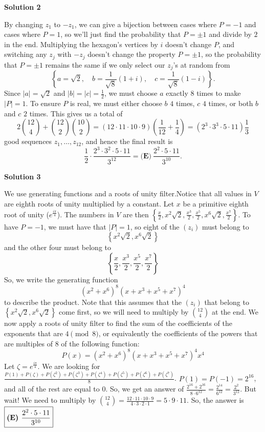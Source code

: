 \begin{enumerate}
\textbf{Solution 2}

By changing $z_1$ to $-z_1$, we can give a bijection between cases where $P=-1$ and cases where $P=1$, so we'll just find the probability that $P=\pm 1$ and divide by $2$ in the end. Multiplying the hexagon's vertices by $i$ doesn't change $P$, and switching any $z_j$ with $-z_j$ doesn't change the property $P=\pm 1$, so the probability that $P=\pm1$ remains the same if we only select our $z_j$'s at random from
 \[\left\{a= \sqrt 2,\quad b=\frac1{\sqrt{8}}(1+i),\quad c=\frac1{\sqrt{8}}(1-i)\right\}.\]Since $|a|=\sqrt2$ and $|b|=|c|=\frac12$, we must choose $a$ exactly $8$ times to make $|P|=1$. To ensure $P$ is real, we must either choose $b$ $4$ times, $c$ $4$ times, or both $b$ and $c$ $2$ times. This gives us a total of 
 \[2\binom{12}{4}+\binom{12}{2}\binom{10}{2}=(12\cdot 11\cdot 10\cdot 9)\left(\frac1{12}+\frac14\right)=(2^3\cdot 3^3\cdot 5\cdot 11)\frac13\]good sequences $z_1,\dots,z_{12}$, and hence the final result is
 \[\frac12\cdot \frac{2^3\cdot 3^2\cdot 5\cdot 11}{3^{12}}=\boxed{\textbf{(E)} ~\frac{2^2\cdot 5\cdot 11}{3^{10}}}.\]




\textbf{Solution 3}

We use generating functions and a roots of unity filter.Notice that all values in $V$ are eighth roots of unity multiplied by a constant.  Let $x$ be a primitive eighth root of unity ($e^{\frac{i\pi}{4}}$).  The numbers in $V$ are then $\left \{ \frac{x}{2},x^2\sqrt2,\frac{x^3}{2},\frac{x^5}{2},x^6\sqrt2,\frac{x^7}{2} \right\}$.  To have $P=-1$, we must have that $|P|=1$, so eight of the $(z_i)$ must belong to 
 \[\left \{ x^2\sqrt2,x^6\sqrt2 \right\}\]and the other four must belong to 
 \[\left \{ \frac{x}{2},\frac{x^3}{2},\frac{x^5}{2},\frac{x^7}{2} \right\}\]So, we write the generating function 
 \[\left (x^2 +x^6 \right )^8 \left (x+x^3+x^5+x^7 \right )^4\]to describe the product.  Note that this assumes that the $(z_i)$ that belong to $\left \{ x^2\sqrt2,x^6\sqrt2 \right\}$ come first, so we will need to multiply by $\binom{12}{4}$ at the end.  We now apply a roots of unity filter to find the sum of the coefficients of the exponents that are $4\pmod{8}$, or equivalently the coefficients of the powers that are multiples of $8$ of the following function:
 \[P(x)=\left (x^2 +x^6 \right )^8 \left (x+x^3+x^5+x^7 \right )^4x^4\]Let $\zeta=e^{\frac{i\pi}{4}}$.  We are looking for $\frac{P(1)+P(\zeta)+P(\zeta^2)+P(\zeta^3)+P(\zeta^4)+P(\zeta^5)+P(\zeta^6)+P(\zeta^7)}{8}$.  $P(1)=P(-1)=2^{16}$, and all of the rest are equal to $0$.  So, we get an answer of $\frac{2^{16}+2^{16}}{8\cdot 6^{12}}=\frac{2^{14}}{6^{12}}=\frac{2^2}{3^{12}}$.  But wait!  We need to multiply by $\binom{12}{4} =\frac{12\cdot11\cdot10\cdot9}{4\cdot3\cdot2\cdot1}$$=5\cdot9\cdot11$.  So, the answer is $\boxed{\text{\textbf{(E) }} \frac{2^2\cdot5\cdot11}{3^{10}} }$


\end{enumerate}
